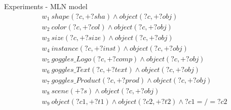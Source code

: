 \documentclass[]{beamer}
\begin{document}
\begin{frame}{Experiments - MLN model}
\begin{align*}
& w_{1} \ shape(?c, +?sha) \wedge object(?c, +?obj) \\
& w_{2} \ color(?c, +?col) \wedge object(?c, +?obj) \\
& w_{3} \ size(?c, +?size) \wedge object(?c, +?obj) \\
& w_{4} \ instance(?c, +?inst) \wedge object(?c, +?obj) \\
& w_{5} \ goggles\_Logo(?c, +?comp) \wedge object(?c, +?obj)\\
& w_{6} \ goggles\_Text(?c, +?text) \wedge object(?c, +?obj)\\
& w_{7} \ goggles\_Product(?c, +?prod) \wedge object(?c, +?obj)\\
& w_{8} \ scene(+?s) \wedge object(?c, +?obj)\\
& w_{9} \ object(?c1, +?t1) \wedge object(?c2, +?t2) \wedge ?c1 =/= ?c2
\end{align*}
\end{frame}
\end{document}
